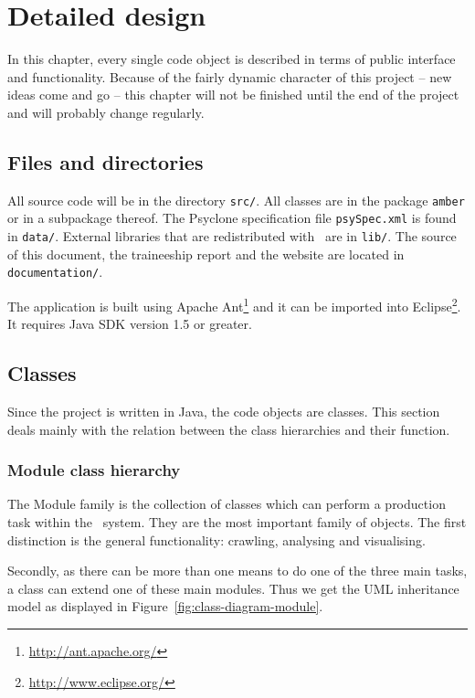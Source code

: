 \chapter{Detailed design}

In this chapter, every single code object is described in terms of public
interface and functionality. Because of the fairly dynamic character of this
project -- new ideas come and go -- this chapter will not be finished until the
end of the project and will probably change regularly.

\section{Files and directories}

All source code will be in the directory \texttt{src/}. All classes are in the
package \texttt{amber} or in a subpackage thereof. The Psyclone specification
file \texttt{psySpec.xml} is found in \texttt{data/}. External libraries that
are redistributed with \Amber\ are in \texttt{lib/}. The source of this
document, the traineeship report and the website are located in
\texttt{documentation/}.

The application is built using Apache
Ant\footnote{\url{http://ant.apache.org/}} and it can be imported into
Eclipse\footnote{\url{http://www.eclipse.org/}}. It requires Java SDK version
1.5 or greater.

\section{Classes}

Since the project is written in Java, the code objects are classes. This
section deals mainly with the relation between the class hierarchies and their
function.

\subsection{Module class hierarchy}

The Module family is the collection of classes which can perform a production
task within the \Amber\ system. They are the most important family of objects.
The first distinction is the general functionality: crawling, analysing and
visualising.

Secondly, as there can be more than one means to do one of the three main
tasks, a class can extend one of these main modules. Thus we get the UML
inheritance model as displayed in Figure~\ref{fig:class-diagram-module}.

